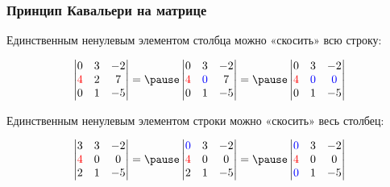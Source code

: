 \begin{frame}
    \frametitle{Принцип Кавальери на матрице}
    
    Единственным ненулевым элементом столбца можно «скосить» всю строку:

    \[
    \begin{vmatrix}
        0 & 3 & -2 \\
        \red{4} & 2 & 7 \\
        0 & 1 & -5 \\
    \end{vmatrix} =  \pause 
\begin{vmatrix}
    0 & 3 & -2 \\
    \red{4} & \blue{0} & 7 \\
    0 & 1 & -5 \\
\end{vmatrix}  = \pause 
\begin{vmatrix}
    0 & 3 & -2 \\
    \red{4} & \blue{0} & \blue{0} \\
    0 & 1 & -5 \\
\end{vmatrix}  
    \]

    \pause
    Единственным ненулевым элементом строки можно «скосить» весь столбец:
    
    \[
    \begin{vmatrix}
        3 & 3 & -2 \\
        \red{4} & 0 & 0 \\
        2 & 1 & -5 \\
    \end{vmatrix} = \pause 
\begin{vmatrix}
    \blue{0} & 3 & -2 \\
\red{4} & 0 & 0 \\
2 & 1 & -5 \\
\end{vmatrix}  = \pause 
\begin{vmatrix}
    \blue{0} & 3 & -2 \\
\red{4} & 0 & 0 \\
\blue{0} & 1 & -5 \\
\end{vmatrix}  
    \]
    
\end{frame}


